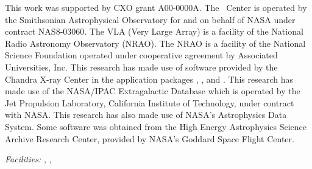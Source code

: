 \documentclass{emulateapj}
\begin{document}
This work was supported by CXO grant A00-0000A. The \cxo\ Center is
operated by the Smithsonian Astrophysical Observatory for and on
behalf of NASA under contract NAS8-03060. The VLA (Very Large Array)
is a facility of the National Radio Astronomy Observatory (NRAO). The
NRAO is a facility of the National Science Foundation operated under
cooperative agreement by Associated Universities, Inc. This research
has made use of software provided by the Chandra X-ray Center in the
application packages \ciao, \chips, and \sherpa. This research has
made use of the NASA/IPAC Extragalactic Database which is operated by
the Jet Propulsion Laboratory, California Institute of Technology,
under contract with NASA. This research has also made use of NASA's
Astrophysics Data System. Some software was obtained from the High
Energy Astrophysics Science Archive Research Center, provided by
NASA's Goddard Space Flight Center.


{\it Facilities:} , , 





\clearpage

%
%
%

\end{document}
